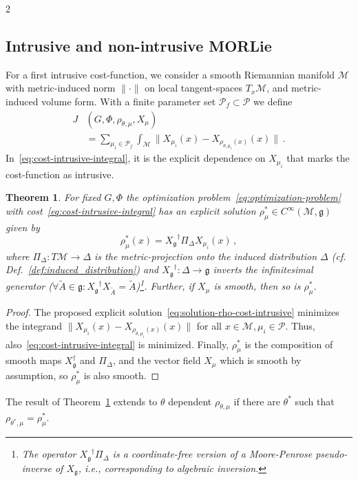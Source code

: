 \documentclass{article}
\newtheorem{theorem}{Theorem}[section]
\newtheorem{proof}{Proof}[theorem]
\newcommand{\M}{\mathcal{M}}                                %
\newcommand{\g}{\mathfrak{g}}                               %
\newcommand{\state}{x}
\begin{document}
\begin{multicols}{2}
\subsection{Intrusive and non-intrusive MORLie}
For a first intrusive cost-function, we consider a smooth Riemannian manifold $\M$ with metric-induced norm $\| \cdot\|$ on local tangent-spaces $T_\state\M$, and metric-induced volume form. With a finite parameter set $\mathcal{P}_f\subset \mathcal{P}$ we define
\begin{align}\label{eq:cost-intrusive-integral}
    J&(G,\Phi,\rho_{\theta,\mu},X_\mu) \\
    & = \sum_{\mu_i\in\mathcal{P}_f}\int_\M \|X_{\mu_i}(\state) - X_{\rho_{\theta,\mu_i}(\state)}(\state) \| \,. \nonumber
\end{align}
In~\eqref{eq:cost-intrusive-integral}, it is the explicit dependence on $X_{\mu_i}$ that marks the cost-function as intrusive.
\begin{theorem}\label{thm:explicit-rho-intrusive}
    For fixed $G,\Phi$ the optimization problem~\eqref{eq:optimization-problem} with cost~\eqref{eq:cost-intrusive-integral} has an explicit solution $\rho^*_{\mu} \in C^\infty(\M,\g)$ given by 
    \begin{equation}\label{eq:solution-rho-cost-intrusive}
        \rho^*_{\mu}(\state) = {X_\g}^{\dagger} \Pi_\Delta X_{\mu_i}(\state)\,,
    \end{equation}
    where $\Pi_\Delta:T\M\rightarrow\Delta$ is the metric-projection onto the induced distribution $\Delta$ (cf. Def.~\ref{def:induced_distribution}) and ${X_\g}^{\dagger}:\Delta\rightarrow\g$ inverts the infinitesimal generator ($\forall{\widetilde{A}\in\g}:{X_\g}^{\dagger}X_{\widetilde{A}} = \widetilde{A}$)\footnote{The operator ${X_\g}^{\dagger} \Pi_\Delta$ is a coordinate-free version of a Moore-Penrose pseudo-inverse of $X_\g$, i.e., corresponding to algebraic inversion.}. Further, if $X_\mu$ is smooth, then so is $\rho^*_\mu$.
\end{theorem}
\begin{proof}
    The proposed explicit solution~\eqref{eq:solution-rho-cost-intrusive} minimizes the integrand $\|X_{\mu_i}(\state) - X_{\rho_{\theta,\mu_i}(\state)}(\state) \|$ for all $\state\in\M,\mu_i \in \mathcal{P}$. Thus, also~\eqref{eq:cost-intrusive-integral} is minimized. Finally, $\rho^*_\mu$ is the composition of smooth maps $X_\g^\dagger$ and $\Pi_\Delta$, and the vector field $X_{\mu}$ which is smooth by assumption, so $\rho^*_\mu$ is also smooth.
\end{proof}
The result of Theorem~\ref{thm:explicit-rho-intrusive} extends to $\theta$ dependent $\rho_{\theta,\mu}$ if there are $\theta^*$ such that $\rho_{\theta^*,\mu}= \rho_\mu^*$. 


\end{multicols}
\end{document}
